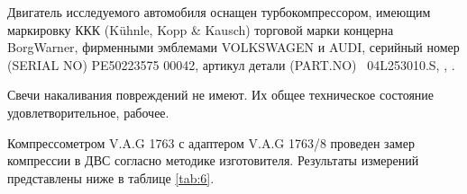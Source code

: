 Двигатель исследуемого автомобиля оснащен турбокомпрессором, имеющим маркировку ККК (Kühnle, Kopp \& Kausch) торговой марки  концерна BorgWarner,  фирменными эмблемами VOLKSWAGEN и AUDI, серийный номер (SERIAL NO) PE50223575 00042, артикул детали (PART.NO)  04L253010.S, , .






Свечи накаливания  повреждений не имеют. Их общее техническое состояние удовлетворительное, рабочее.  

Компрессометром V.A.G  1763  с адаптером V.A.G 1763/8 проведен замер компрессии в ДВС согласно методике изготовителя.  Результаты измерений представлены ниже в таблице \ref{tab:6}.
 
